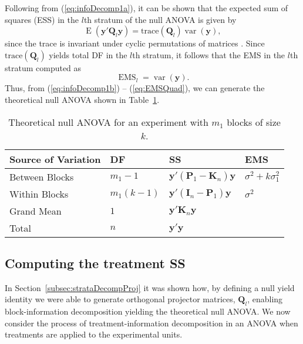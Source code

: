 \documentclass[article]{jss}
\newcommand{\mP}{\mathbf{P}}
\newcommand{\I}{\mathbf{I}}
\newcommand{\K}{\mathbf{K}}
\newcommand{\Q}{\mathbf{Q}}
\begin{document}
Following from (\ref{eq:infoDecomp1a}), it can be shown that the expected sum of squares (ESS) in the $l$th stratum of the null ANOVA is given by
\begin{equation}
\label{eq:ESSQuad}
\operatorname{E}(\bm{y}'\Q_l\bm{y})= \mathrm{trace}(\Q_l)\operatorname{var}(\bm{y}),
\end{equation}
since the trace is invariant under cyclic permutations of matrices \citep{Searle1982}. Since $ \mathrm{trace}(\Q_l)$ yields total DF in the $l$th stratum, it follows that the EMS in the $l$th stratum computed as 
\begin{equation}\label{eq:EMSQuad}
\operatorname{EMS}_l=\operatorname{var}(\bm{y}).
\end{equation}
Thus, from (\ref{eq:infoDecomp1b}) -- (\ref{eq:EMSQuad}), we can generate  the theoretical null ANOVA shown in Table~\ref{tab:infoDecomp}. 

\begin{table}[ht]
\centering
\caption{Theoretical null ANOVA	for an experiment with $m_1$ blocks of size $k$.}
\begin{tabular}[t]{llll}
\toprule
 \multicolumn{1}{l}{\bf Source of Variation}&  \multicolumn{1}{l}{\bf DF} & \multicolumn{1}{l}{\bf SS} & \multicolumn{1}{l}{\bf EMS}\\
\midrule
Between Blocks 	 &$m_1-1$ & $\bm{y}'(\mP_{1}-\K_n)\bm{y}$	& $\sigma^2 + k\sigma_{1}^2$\\
Within Blocks 	&$m_1(k - 1)$ & $\bm{y}'(\I_n - \mP_{1})\bm{y}$  & $\sigma^2$\\
\hline
Grand Mean	& $1$ & $\bm{y}'\K_n\bm{y}$ \\
\midrule
Total 	& $n$ & $\bm{y}'\bm{y}$ \\
\bottomrule
\end{tabular}
\label{tab:infoDecomp}
\end{table}

\subsection{Computing the treatment SS}
\label{subsec:estTrt}
In Section~\ref{subsec:strataDecompProj} it was shown how, by defining a null yield identity we were able to generate orthogonal projector matrices, $\Q_{l}$, enabling block-information decomposition yielding the theoretical null ANOVA. We now consider the process of treatment-information decomposition in an ANOVA when treatments are applied to the experimental units. 
\end{document}
